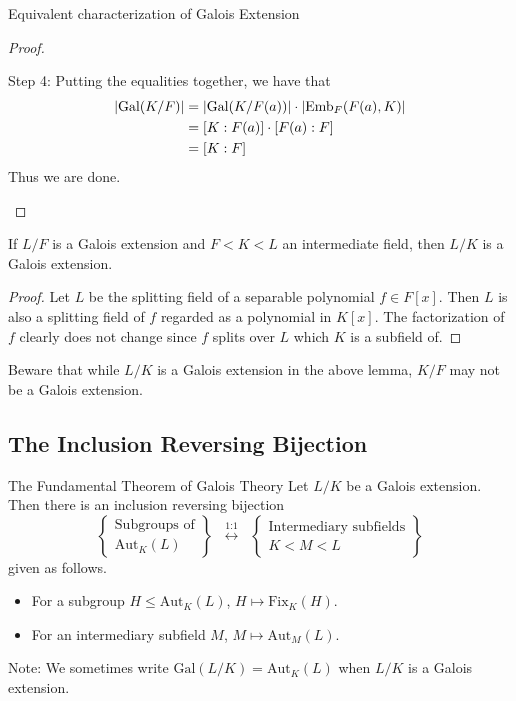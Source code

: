\documentclass[a4paper]{article}
\begin{document}
\begin{prp}{Equivalent characterization of Galois Extension}{}
\begin{proof}
\begin{itemize}
Step 4: Putting the equalities together, we have that 
\begin{align*}
\abs{\text{Gal}(K/F)}&=\abs{\text{Gal}(K/F(a))}\cdot\abs{\text{Emb}_F(F(a),K)}\\
&=[K:F(a)]\cdot[F(a):F]\\
&=[K:F]
\end{align*}
Thus we are done. 
\end{itemize}
\end{proof}
\end{prp}

\begin{lmm}{}{} If $L/F$ is a Galois extension and $F<K<L$ an intermediate field, then $L/K$ is a Galois extension. 
\begin{proof}
Let $L$ be the splitting field of a separable polynomial $f\in F[x]$. Then $L$ is also a splitting field of $f$ regarded as a polynomial in $K[x]$. The factorization of $f$ clearly does not change since $f$ splits over $L$ which $K$ is a subfield of. 
\end{proof}
\end{lmm}

Beware that while $L/K$ is a Galois extension in the above lemma, $K/F$ may not be a Galois extension. 

\subsection{The Inclusion Reversing Bijection}
\begin{thm}{The Fundamental Theorem of Galois Theory}{} Let $L/K$ be a Galois extension. Then there is an inclusion reversing bijection $$\left\{\substack{\text{Subgroups of}\\\text{Aut}_K(L)}\right\}\;\;\overset{\text{1:1}}{\longleftrightarrow}\;\;\left\{\substack{\text{Intermediary subfields}\\ K<M<L}\right\}$$ given as follows. 
\begin{itemize}
\item For a subgroup $H\leq\text{Aut}_K(L)$, $H\mapsto\text{Fix}_K(H)$. 
\item For an intermediary subfield $M$, $M\mapsto\text{Aut}_M(L)$. 
\end{itemize}
\end{thm}

Note: We sometimes write $\text{Gal}(L/K)=\text{Aut}_K(L)$ when $L/K$ is a Galois extension. 
\end{document}
